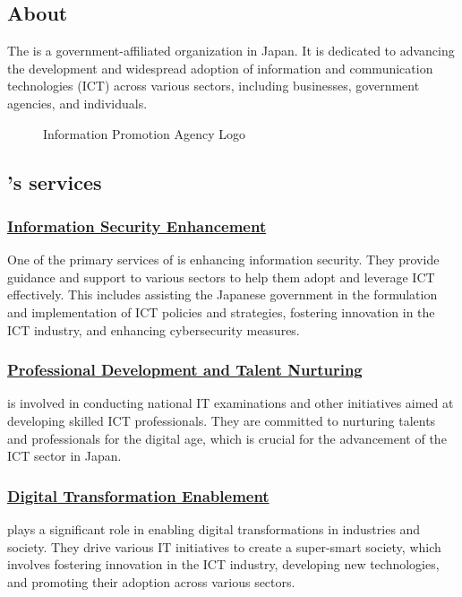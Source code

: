 \subsection{About  \cite{about-ipa}}
The  is a government-affiliated organization in Japan. It is dedicated to advancing the development and widespread adoption of information and communication technologies (ICT) across various sectors, including businesses, government agencies, and individuals.
\begin{figure}[H]
    \centering
    \caption{Information Promotion Agency Logo}
    \label{fig:logo-of-IPA}
\end{figure}

\subsection{'s services}
\subsubsection*{\underline{Information Security Enhancement}}
One of the primary services of  is enhancing information security. They provide guidance and support to various sectors to help them adopt and leverage ICT effectively. This includes assisting the Japanese government in the formulation and implementation of ICT policies and strategies, fostering innovation in the ICT industry, and enhancing cybersecurity measures.

\subsubsection*{\underline{Professional Development and Talent Nurturing}}
 is involved in conducting national IT examinations and other initiatives aimed at developing skilled ICT professionals. They are committed to nurturing talents and professionals for the digital age, which is crucial for the advancement of the ICT sector in Japan.

\subsubsection*{\underline{Digital Transformation Enablement}}
 plays a significant role in enabling digital transformations in industries and society. They drive various IT initiatives to create a super-smart society, which involves fostering innovation in the ICT industry, developing new technologies, and promoting their adoption across various sectors.

